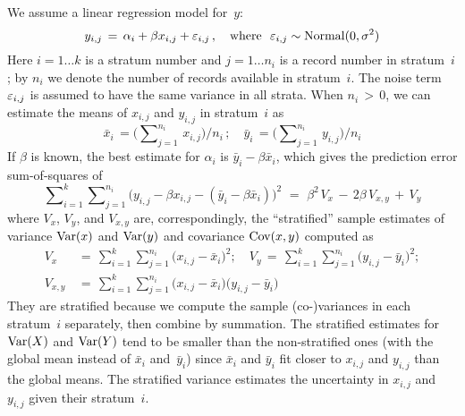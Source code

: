 We assume a linear regression model for~$y$:
\begin{equation}
y_{i,j} \,=\, \alpha_i + \beta x_{i,j} + \varepsilon_{i,j}\,, \quad\textrm{where}\,\,\,\,
\varepsilon_{i,j} \sim \mathop{\mathrm{Normal}}\nolimits(0, \sigma^2)
\label{eqn:stratlinmodel}
\end{equation}
Here $i = 1\ldots k$ is a stratum number and $j = 1\ldots n_i$ is a record number
in stratum~$i$; by $n_i$ we denote the number of records available in stratum~$i$.
The noise term~$\varepsilon_{i,j}$ is assumed to have the same variance in all strata.
When $n_i\,{>}\,0$, we can estimate the means of $x_{i, j}$ and $y_{i, j}$ in
stratum~$i$ as
\begin{equation*}
\bar{x}_i \,= \Big(\sum\nolimits_{j=1}^{n_i} \,x_{i, j}\Big) / n_i\,;\quad
\bar{y}_i \,= \Big(\sum\nolimits_{j=1}^{n_i} \,y_{i, j}\Big) / n_i
\end{equation*}
If $\beta$ is known, the best estimate for $\alpha_i$ is $\bar{y}_i - \beta \bar{x}_i$,
which gives the prediction error sum-of-squares of
\begin{equation}
\sum\nolimits_{i=1}^k \sum\nolimits_{j=1}^{n_i} \big(y_{i,j} - \beta x_{i,j} - (\bar{y}_i - \beta \bar{x}_i)\big)^2
\,\,=\,\, \beta^{2\,}V_x \,-\, 2\beta \,V_{x,y} \,+\, V_y
\label{eqn:stratsumsq}
\end{equation}
where $V_x$, $V_y$, and $V_{x, y}$ are, correspondingly, the ``stratified'' sample
estimates of variance $\mathop{\mathrm{Var}}\nolimits(x)$ and $\mathop{\mathrm{Var}}\nolimits(y)$ and covariance $\mathop{\mathrm{Cov}}\nolimits(x,y)$ computed as
\begin{align*}
V_x     \,&=\, \sum\nolimits_{i=1}^k \sum\nolimits_{j=1}^{n_i} \big(x_{i,j} - \bar{x}_i\big)^2; \quad
V_y     \,=\, \sum\nolimits_{i=1}^k \sum\nolimits_{j=1}^{n_i} \big(y_{i,j} - \bar{y}_i\big)^2;\\
V_{x,y} \,&=\, \sum\nolimits_{i=1}^k \sum\nolimits_{j=1}^{n_i} \big(x_{i,j} - \bar{x}_i\big)\big(y_{i,j} - \bar{y}_i\big)
\end{align*}
They are stratified because we compute the sample (co-)variances in each stratum~$i$
separately, then combine by summation.  The stratified estimates for $\mathop{\mathrm{Var}}\nolimits(X)$ and $\mathop{\mathrm{Var}}\nolimits(Y)$
tend to be smaller than the non-stratified ones (with the global mean instead of $\bar{x}_i$
and~$\bar{y}_i$) since $\bar{x}_i$ and $\bar{y}_i$ fit closer to $x_{i,j}$ and $y_{i,j}$
than the global means.  The stratified variance estimates the uncertainty in $x_{i,j}$ 
and~$y_{i,j}$ given their stratum~$i$.

